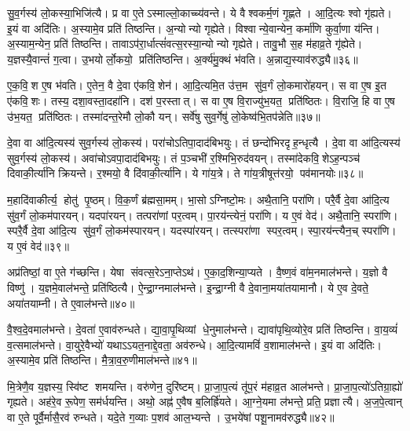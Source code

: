 सु॒व॒र्गस्य॑ लो॒कस्या॒भिजि॑त्यै।
प्र वा ए॒तेऽस्माल्लो॒काच्च्य॑वन्ते।
ये वैश्वकर्म॒णं गृ॒ह्णते।
आ॒दि॒त्यः श्वो गृ॑ह्यते।
इ॒यं वा अदि॑तिः।
अ॒स्यामे॒व प्रति॑ तिष्ठन्ति।
अ॒न्योन्यो गृह्येते।
विश्वान्ये॒वान्येन॒ कर्मा॑णि कुर्वा॒णा य॑न्ति।
अ॒स्याम॒न्येन॒ प्रति॑ तिष्ठन्ति।
तावाऽप॑रा॒र्धात्सं॑वत्स॒रस्या॒न्योन्यो गृह्येते।
तावु॒भौ स॒ह म॑हाव्र॒ते गृ॑ह्येते।
य॒ज्ञस्यै॒वान्तं॑ ग॒त्वा।
उ॒भयोर्लो॒कयो॒ प्रति॑तिष्ठन्ति।
अ॒र्क्य॑मु॒क्थं भ॑वति।
अ॒न्नाद्य॒स्याव॑रुद्ध्यै॥३६॥\anuvakamend[स॒मा॒यच्छ॑त्यतिग्रा॒ह्या॑ गृह्यन्ते गृ॒ह्यते॑ संवत्स॒रस्या॒न्योन्यो गृह्येते॒ पञ्च॑ च]

ए॒क॒वि॒श ए॒ष भ॑वति।
ए॒तेन॒ वै दे॒वा ए॑कवि॒शेन॑।
आ॒दि॒त्यमि॒त उ॑त्त॒म सु॑व॒र्गं लो॒कमारो॑हयन्।
स वा ए॒ष इ॒त ए॑कवि॒शः।
तस्य॒ दशा॒वस्ता॒दहा॑नि।
दश॑ प॒रस्तात्।
स वा ए॒ष वि॒राज्यु॑भ॒यत॒ प्रति॑ष्ठितः।
वि॒राजि॒ हि वा ए॒ष उ॑भ॒यत॒ प्रति॑ष्ठितः।
तस्मा॑दन्त॒रेमौ लो॒कौ यन्।
सर्वे॑षु सुव॒र्गेषु॑ लो॒केष्व॑भि॒तप॑न्नेति॥३७॥

दे॒वा वा आ॑दि॒त्यस्य॑ सुव॒र्गस्य॑ लो॒कस्य॑।
परा॑चोऽतिपा॒दा\-द॑बिभयुः।
तं छन्दो॑भिरदृह॒न्धृत्यै।
दे॒वा वा आ॑दि॒त्यस्य॑ सुव॒र्गस्य॑ लो॒कस्य॑।
अवा॑चोऽवपा॒दाद॑बिभयुः।
तं प॒ञ्चभी॑ र॒श्मिभि॒रुद॑वयन्।
तस्मा॑देकवि॒शेऽह॒न्पञ्च॑ दिवाकी॒र्त्या॑नि क्रियन्ते।
र॒श्मयो॒ वै दि॑वाकी॒र्त्या॑नि।
ये गा॑य॒त्रे।
ते गा॑य॒त्रीषूत्त॑रयो॒ पव॑मानयोः॥३८॥

म॒हादि॑वाकीर्त्य॒ होतु॑ पृ॒ष्ठम्।
वि॒क॒र्णं ब्र॑ह्मसा॒मम्।
भा॒सोऽग्निष्टो॒मः।
अथै॒तानि॒ परा॑णि।
परै॒र्वै दे॒वा आ॑दि॒त्य सु॑व॒र्गं लो॒कम॑पारयन्।
यदपा॑रयन्।
तत्परा॑णां पर॒त्वम्।
पा॒रय॑न्त्येनं॒ परा॑णि।
य ए॒वं वेद॑।
अथै॒तानि॒ स्परा॑णि।
स्परै॒र्वै दे॒वा आ॑दि॒त्य सु॑व॒र्गं लो॒कम॑स्पारयन्।
यदस्पा॑रयन्।
तत्स्परा॑णा स्पर॒त्वम्।
स्पा॒रय॑न्त्यैन॒च् स्परा॑णि।
य ए॒वं वेद॑॥३९॥\anuvakamend[ए॒ति॒ पव॑मानयो॒ स्परा॑णि॒ पञ्च॑ च]

अप्र॑तिष्ठां॒ वा ए॒ते ग॑च्छन्ति।
येषा संवत्स॒रेऽना॒प्तेऽथ॑।
ए॒का॒द॒शिन्या॒प्यते।
वै॒ष्ण॒वं वा॑म॒नमाल॑भन्ते।
य॒ज्ञो वै विष्णु॑।
य॒ज्ञमे॒वाल॑भन्ते॒ प्रति॑ष्ठित्यै।
ऐ॒न्द्रा॒ग्नमाल॑भन्ते।
इ॒न्द्रा॒ग्नी वै दे॒वाना॒मया॑तयामानौ।
ये ए॒व दे॒वते॒ अया॑तयाम्नी।
ते ए॒वाल॑भन्ते॥४०॥

वै॒श्व॒दे॒वमाल॑भन्ते।
दे॒वता॑ ए॒वाव॑रुन्धते।
द्या॒वा॒पृ॒थिव्यां धे॒नुमाल॑भन्ते।
द्यावा॑पृथि॒व्योरे॒व प्रति॑ तिष्ठन्ति।
वा॒य॒व्यं॑ व॒त्समाल॑भन्ते।
वा॒युरे॒वैभ्यो॑ यथाऽऽयत॒नाद्दे॒वता॒ अव॑रुन्धे।
आ॒दि॒त्यामविं॑ व॒शामाल॑भन्ते।
इ॒यं वा अदि॑तिः।
अ॒स्यामे॒व प्रति॑ तिष्ठन्ति।
मै॒त्रा॒व॒रु॒णीमाल॑भन्ते॥४१॥

मि॒त्रेणै॒व य॒ज्ञस्य॒ स्वि॑ष्ट शमयन्ति।
वरु॑णेन॒ दुरि॑ष्टम्।
प्रा॒जा॒प॒त्यं तू॑प॒रं म॑हाव्र॒त आल॑भन्ते।
प्रा॒जा॒प॒त्यो॑ऽतिग्रा॒ह्यो॑ गृह्यते।
अह॑रे॒व रू॒पेण॒ सम॑र्धयन्ति।
अथो॒ अह्न॑ ए॒वैष ब॒लिर्ह्रि॑यते।
आ॒ग्ने॒यमा ल॑भन्ते॒ प्रति॒ प्रज्ञात्यै।
अ॒ज॒पे॒त्वान् वा ए॒ते पूर्वै॒र्मासै॒रव॑ रुन्धते।
यदे॒ते ग॒व्याः प॒शव॑ आल॒भ्यन्ते।
उ॒भये॑षां पशू॒नामव॑रुद्ध्यै॥४२॥

